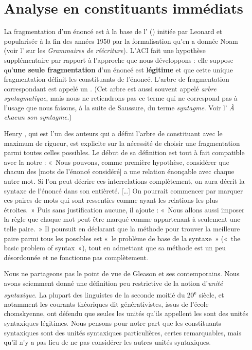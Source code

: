 \section{Analyse en constituants immédiats}\label{sec:3.2.25}

La fragmentation d’un énoncé est à la base de l’ () initiée par Leonard \citet{Bloomfield1933} et popularisée à la fin des années 1950 par la formalisation qu’en a donnée Noam \citet{Chomsky1957} (voir l’ sur les \textit{Grammaires de réécriture}). L’ACI fait une hypothèse supplémentaire par rapport à l’approche que nous développons : elle suppose qu’\textbf{une seule fragmentation} d’un énoncé est \textbf{légitime} et que cette unique fragmentation définit les constituants de l’énoncé. L’arbre de fragmentation correspondant est appelé un . (Cet arbre est aussi souvent appelé \textit{arbre syntagmatique}, mais nous ne retiendrons pas ce terme qui ne correspond pas à l’usage que nous faisons, à la suite de Saussure, du terme \textit{syntagme}. Voir l’ \textit{À chacun son syntagme}.)

Henry \citet{Gleason1955}, qui est l’un des auteurs qui a défini l’arbre de constituant avec le maximum de rigueur, est explicite sur la nécessité de choisir une fragmentation parmi toutes celles possibles. Le début de sa définition est tout à fait compatible avec la notre : «~Nous pouvons, comme première hypothèse, considérer que chacun des [mots de l’énoncé considéré] a une relation énonçable avec chaque autre mot. Si l’on peut décrire ces interrelations complètement, on aura décrit la syntaxe de l’énoncé dans son entièreté. […] On pourrait commencer par marquer ces paires de mots qui sont ressenties comme ayant les relations les plus étroites.~» Puis sans justification aucune, il ajoute : «~Nous allons aussi imposer la règle que chaque mot peut être marqué comme appartenant à seulement une telle paire.~» Il poursuit en déclarant que la méthode pour trouver la meilleure paire parmi tous les possibles est «~le problème de base de la syntaxe~» («~the basic problem of syntax~»), tout en admettant que sa méthode est un peu désordonnée et ne fonctionne pas complètement.

Nous ne partageons pas le point de vue de Gleason et ses contemporains. Nous avons sciemment donné une définition peu restrictive de la notion d’\textit{unité syntaxique}. La plupart des linguistes de la seconde moitié du 20\textsuperscript{e} siècle, et notamment les courants théoriques dit générativistes, issus de l’école chomskyenne, ont défendu que seules les unités qu’ils appellent les  sont des unités syntaxiques légitimes. Nous pensons pour notre part que les constituants syntaxiques sont des unités syntaxiques particulières, certes remarquables, mais qu’il n’y a pas lieu de ne pas considérer les autres unités syntaxiques.

